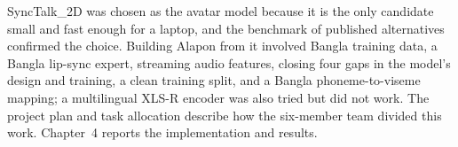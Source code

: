 \noindent
SyncTalk\_2D was chosen as the avatar model because it is the only candidate small and fast enough for a laptop, and the benchmark of published alternatives confirmed the choice. Building Alapon from it involved Bangla training data, a Bangla lip-sync expert, streaming audio features, closing four gaps in the model's design and training, a clean training split, and a Bangla phoneme-to-viseme mapping; a multilingual XLS-R encoder was also tried but did not work. The project plan and task allocation describe how the six-member team divided this work. Chapter~4 reports the implementation and results.\\
